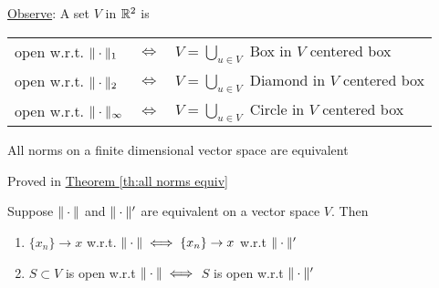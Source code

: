 \underline{Observe}: A set $V$ in $\mathbb{R}^2$ is
\begin{center}
	\begin{tabular}{lcl}
		open w.r.t. $\|\cdot\|_1$ & $\iff$ & $V=\bigcup\limits_{u\in V}$ Box in $V$ centered box\\
		open w.r.t. $\|\cdot\|_2$ & $\iff$ & $V=\bigcup\limits_{u\in V}$ Diamond in $V$ centered box\\
		open w.r.t. $\|\cdot\|_{\infty}$ & $\iff$ & $V=\bigcup\limits_{u\in V}$ Circle in $V$ centered box
	\end{tabular}
\end{center}
\begin{theorem}{}{}
	All norms on a finite dimensional vector space are equivalent
\end{theorem}
\begin{myproof}
	Proved in \hyperref[th:all norms equiv]{Theorem \ref{th:all norms equiv}}
\end{myproof}
\begin{theorem}{}{}
	Suppose $\|\cdot\|$ and $\|\cdot\|'$ are equivalent on a vector space $V$. Then \begin{enumerate}[label=(\roman*)]
		\item $\{x_n\}\to x$ w.r.t. $\|\cdot\|\iff \{x_n\}\to x$ w.r.t $\|\cdot\|'$
		\item $S\subset V$ is open w.r.t $\|\cdot\|\iff$ $S$ is open w.r.t $\|\cdot\|'$
	\end{enumerate}
\end{theorem}
